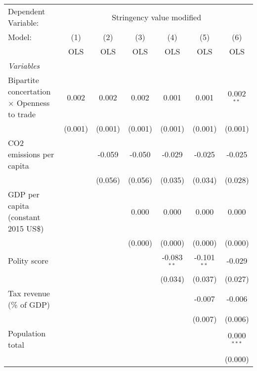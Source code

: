 
\begingroup
\centering
\begin{tabular}{lcccccc}
   \toprule
   Dependent Variable: & \multicolumn{6}{c}{Stringency value modified}\\
   Model:                                             & (1)     & (2)     & (3)     & (4)           & (5)           & (6)\\  
                                                      &  OLS    & OLS     & OLS     & OLS           & OLS           & OLS\\  
   \midrule
   \emph{Variables}\\
   Bipartite concertation $\times$ Openness to trade  & 0.002   & 0.002   & 0.002   & 0.001         & 0.001         & 0.002$^{**}$\\   
                                                      & (0.001) & (0.001) & (0.001) & (0.001)       & (0.001)       & (0.001)\\   
   CO2 emissions per capita                           &         & -0.059  & -0.050  & -0.029        & -0.025        & -0.025\\   
                                                      &         & (0.056) & (0.056) & (0.035)       & (0.034)       & (0.028)\\   
   GDP per capita (constant 2015 US\$)                &         &         & 0.000   & 0.000         & 0.000         & 0.000\\   
                                                      &         &         & (0.000) & (0.000)       & (0.000)       & (0.000)\\   
   Polity score                                       &         &         &         & -0.083$^{**}$ & -0.101$^{**}$ & -0.029\\   
                                                      &         &         &         & (0.034)       & (0.037)       & (0.027)\\   
   Tax revenue (\% of GDP)                            &         &         &         &               & -0.007        & -0.006\\   
                                                      &         &         &         &               & (0.007)       & (0.006)\\   
   Population total                                   &         &         &         &               &               & 0.000$^{***}$\\   
                                                      &         &         &         &               &               & (0.000)\\   

\end{tabular}
